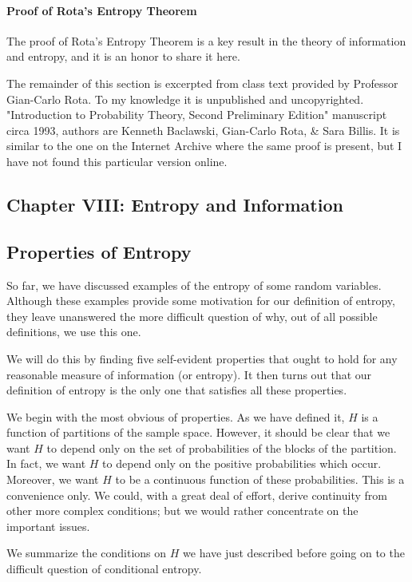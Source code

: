 \documentclass{report}
\begin{document}
\paragraph{Proof of Rota's Entropy Theorem}
The proof of Rota's Entropy Theorem is a key result in the theory of information and entropy, and it is an honor to share it here.

The remainder of this section is excerpted from class text provided by Professor Gian-Carlo Rota. To my knowledge it is unpublished and uncopyrighted. "Introduction to Probability Theory, Second Preliminary Edition" manuscript circa 1993, authors are Kenneth Baclawski, Gian-Carlo Rota, \& Sara Billis. It is similar to the one on the Internet Archive\cite{RotaBaclawski} where the same proof is present, but I have not found this particular version online. 
\medskip
\medskip

\subsection*{Chapter VIII: Entropy and Information}
\normalsize
\subsection*{Properties of Entropy}

So far, we have discussed examples of the entropy of some random variables. Although these examples provide some motivation for our definition of entropy, they leave unanswered the more difficult question of why, out of all possible definitions, we use this one.

We will do this by finding five self-evident properties that ought to hold for any reasonable measure of information (or entropy). It then turns out that our definition of entropy is the only one that satisfies all these properties.

We begin with the most obvious of properties. As we have defined it, \( H \) is a function of partitions of the sample space. However, it should be clear that we want \( H \) to depend only on the set of probabilities of the blocks of the partition. In fact, we want \( H \) to depend only on the positive probabilities which occur. Moreover, we want \( H \) to be a continuous function of these probabilities. This is a convenience only. We could, with a great deal of effort, derive continuity from other more complex conditions; but we would rather concentrate on the important issues. 

We summarize the conditions on \( H \) we have just described before going on to the difficult question of conditional entropy.
\end{document}
